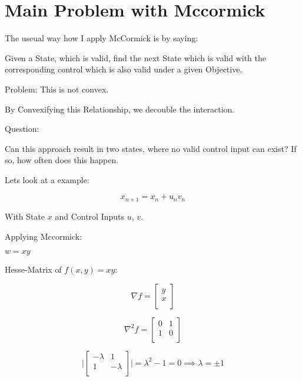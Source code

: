 \chapter{Main Problem with Mccormick}

The useual way how I apply McCormick is by saying:

Given a State, which is valid, find the next State which is valid with the
corresponding control which is also valid under a given Objective.

Problem: This is not convex.

By Convexifying this Relationship, we decouble the interaction.

Question:

Can this approach result in two states, where no valid control input can exist?
If so, how often does this happen.

Lets look at a example:

\[ x_{n+1} = x_{n} + u_{n} v_{n} \]

With State $x$ and Control Inputs $u$, $v$.

Applying Mccormick:

$w=xy$

\pagebreak

Hesse-Matrix of $f(x,y)=xy$:

\[
	\nabla f = \begin{bmatrix}
		y \\
		x \\
	\end{bmatrix}
\]

\[
	\nabla^2 f = \begin{bmatrix}
		0 & 1 \\
		1 & 0 \\
	\end{bmatrix}
\]

\[
	\vert \begin{bmatrix}
		-\lambda & 1        \\
		1        & -\lambda \\
	\end{bmatrix} \vert = \lambda^2-1 = 0 \implies \lambda=\pm1
\]

